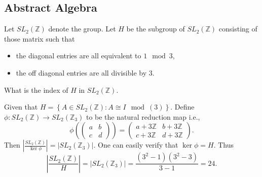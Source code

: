 \subsection{Abstract Algebra}

\question Let $SL_2(\mathbb{Z})$ denote the group. Let $H$ be the subgroup of $SL_2(\mathbb{Z})$ consisting of those matrix such that
\begin{itemize}
    \item the diagonal entries are all equivalent to $1\mod{3}$,
    \item the off diagonal entries are all divisible by 3.
\end{itemize}
What is the index of $H$ in $SL_2(\mathbb{Z})$.

\begin{solution}
    Given that $H=\left\{A\in SL_2(\mathbb{Z}): A\cong I\mod(3)\right\}$. Define $\phi:SL_2(\mathbb{Z})\to SL_2(\mathbb{Z}_3)$ to be the natural reduction map i.e.,
    $$\phi\left(\begin{pmatrix}a&b\\c&d\end{pmatrix}\right)=\begin{pmatrix}a+3\mathbb{Z}&b+3\mathbb{Z}\\c+3\mathbb{Z}&d+3\mathbb{Z}\end{pmatrix}.$$
    Then $\left|\frac{SL_2(\mathbb{Z})}{\ker{\phi}}\right|=\left|SL_2(\mathbb{Z}_3)\right|$. One can easily verify that $\ker{\phi}=H$. Thus
    $$\left|\frac{SL_2(\mathbb{Z})}{H}\right|=\left|SL_2(\mathbb{Z}_3)\right|=\frac{(3^2-1)(3^2-3)}{3-1}=24.$$
\end{solution}

